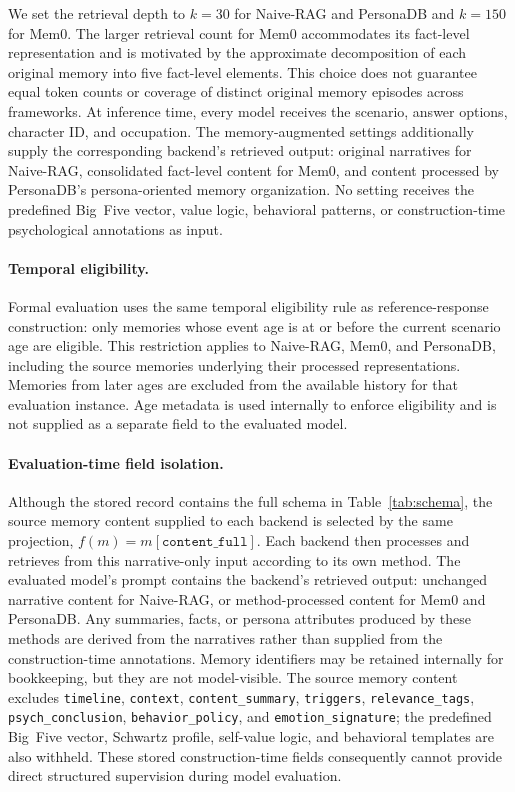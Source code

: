 \documentclass[11pt]{article}
\begin{document}
We set the retrieval depth to $k{=}30$ for Naive-RAG and PersonaDB and $k{=}150$ for Mem0. The larger retrieval count for Mem0 accommodates its fact-level representation and is motivated by the approximate decomposition of each original memory into five fact-level elements. This choice does not guarantee equal token counts or coverage of distinct original memory episodes across frameworks. At inference time, every model receives the scenario, answer options, character ID, and occupation. The memory-augmented settings additionally supply the corresponding backend's retrieved output: original narratives for Naive-RAG, consolidated fact-level content for Mem0, and content processed by PersonaDB's persona-oriented memory organization. No setting receives the predefined Big~Five vector, value logic, behavioral patterns, or construction-time psychological annotations as input.

\paragraph{Temporal eligibility.}
Formal evaluation uses the same temporal eligibility rule as reference-response construction: only memories whose event age is at or before the current scenario age are eligible. This restriction applies to Naive-RAG, Mem0, and PersonaDB, including the source memories underlying their processed representations. Memories from later ages are excluded from the available history for that evaluation instance. Age metadata is used internally to enforce eligibility and is not supplied as a separate field to the evaluated model.

\paragraph{Evaluation-time field isolation.}
Although the stored record contains the full schema in Table~\ref{tab:schema}, the source memory content supplied to each backend is selected by the same projection, $f(m)=m[\texttt{content\_full}]$. Each backend then processes and retrieves from this narrative-only input according to its own method. The evaluated model's prompt contains the backend's retrieved output: unchanged narrative content for Naive-RAG, or method-processed content for Mem0 and PersonaDB. Any summaries, facts, or persona attributes produced by these methods are derived from the narratives rather than supplied from the construction-time annotations. Memory identifiers may be retained internally for bookkeeping, but they are not model-visible. The source memory content excludes \texttt{timeline}, \texttt{context}, \texttt{content\_summary}, \texttt{triggers}, \texttt{relevance\_tags}, \texttt{psych\_conclusion}, \texttt{behavior\_policy}, and \texttt{emotion\_signature}; the predefined Big~Five vector, Schwartz profile, self-value logic, and behavioral templates are also withheld. These stored construction-time fields consequently cannot provide direct structured supervision during model evaluation.
\end{document}
